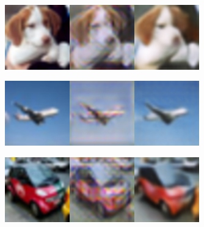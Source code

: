 \begin{table}[t]
\begin{minipage}{0.375\textwidth}
\begin{center}
\vspace{-0.475cm}
\includegraphics[width=0.63\textwidth]{figs/resnet28/rec_tile_5.jpg}

\includegraphics[width=0.63\textwidth]{figs/resnet28/rec_tile_1.jpg}

\includegraphics[width=0.63\textwidth]{figs/resnet28/rec_tile_2.jpg}
\end{center}
\end{minipage}
\vspace{-1 cm}
\end{table}

